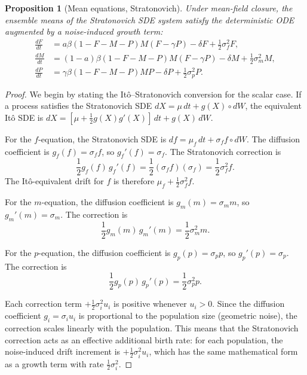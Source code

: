 \documentclass[12pt]{article}
\newtheorem{proposition}{Proposition}
\begin{document}
\begin{proposition}[Mean equations, Stratonovich]\label{prop:strat_means}
Under mean-field closure, the ensemble means of the Stratonovich SDE system satisfy the deterministic ODE augmented by a noise-induced growth term:
\begin{align}
  \frac{dF}{dt} &= a\beta(1-F-M-P)M(F - \gamma P) - \delta F + \tfrac{1}{2}\sigma_f^2 F, \\
  \frac{dM}{dt} &= (1-a)\beta(1-F-M-P)M(F - \gamma P) - \delta M + \tfrac{1}{2}\sigma_m^2 M, \\
  \frac{dP}{dt} &= \gamma\beta(1-F-M-P)MP - \delta P + \tfrac{1}{2}\sigma_p^2 P.
\end{align}
\end{proposition}

\begin{proof}
We begin by stating the It\^{o}--Stratonovich conversion for the scalar case.  If a process satisfies the Stratonovich SDE $dX = \mu\,dt + g(X)\circ dW$, the equivalent It\^{o} SDE is $dX = [\mu + \tfrac{1}{2}g(X)g'(X)]\,dt + g(X)\,dW$.

For the $f$-equation, the Stratonovich SDE is $df = \mu_f\,dt + \sigma_f f \circ dW$.  The diffusion coefficient is $g_f(f) = \sigma_f f$, so $g_f'(f) = \sigma_f$.  The Stratonovich correction is
\begin{equation}
  \frac{1}{2}g_f(f)\,g_f'(f) = \frac{1}{2}(\sigma_f f)(\sigma_f) = \frac{1}{2}\sigma_f^2 f.
\end{equation}
The It\^{o}-equivalent drift for $f$ is therefore $\mu_f + \tfrac{1}{2}\sigma_f^2 f$.

For the $m$-equation, the diffusion coefficient is $g_m(m) = \sigma_m m$, so $g_m'(m) = \sigma_m$.  The correction is
\begin{equation}
  \frac{1}{2}g_m(m)\,g_m'(m) = \frac{1}{2}\sigma_m^2 m.
\end{equation}

For the $p$-equation, the diffusion coefficient is $g_p(p) = \sigma_p p$, so $g_p'(p) = \sigma_p$.  The correction is
\begin{equation}
  \frac{1}{2}g_p(p)\,g_p'(p) = \frac{1}{2}\sigma_p^2 p.
\end{equation}

Each correction term $+\tfrac{1}{2}\sigma_i^2 u_i$ is positive whenever $u_i > 0$.  Since the diffusion coefficient $g_i = \sigma_i u_i$ is proportional to the population size (geometric noise), the correction scales linearly with the population.  This means that the Stratonovich correction acts as an effective additional birth rate: for each population, the noise-induced drift increment is $+\tfrac{1}{2}\sigma_i^2 u_i$, which has the same mathematical form as a growth term with rate $\tfrac{1}{2}\sigma_i^2$.


\end{proof}
\end{document}
